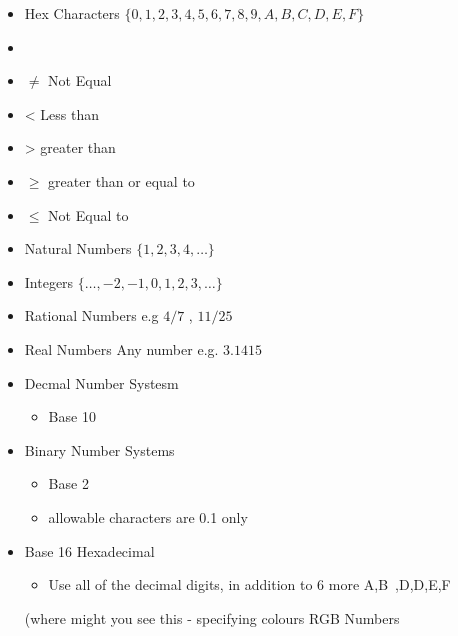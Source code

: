 
\begin{itemize}
\item Hex Characters $\{0,1,2,3,4,5,6,7,8,9,A,B,C,D,E,F\}$
\item 
\end{itemize}


\begin{itemize}
\item $\neq$ Not Equal
\item < Less than
\item > greater than
\item $\geq$ greater than or equal to
\item $\leq$ Not Equal to
\end{itemize}


\begin{itemize}
\item Natural Numbers $\{1,2,3,4, \ldots\}$
\item Integers $\{\ldots,-2,-1,0,1,2,3,\ldots\}$
\item Rational Numbers e.g $4/7$ , $11/25$
\item Real Numbers Any number e.g. $3.1415$
\end{itemize}




\begin{itemize}
\item Decmal Number Systesm
\begin{itemize}
\item Base 10
\end{itemize}

\item Binary Number Systems
\begin{itemize}
\item Base 2
\item allowable characters are {0.1} only
\end{itemize}
\item Base 16 Hexadecimal
\begin{itemize}
\item Use all of the decimal digits, in addition to 6 more A,B~,D,D,E,F
\end{itemize}
(where might you see this  - specifying colours RGB Numbers
\end{itemize}

